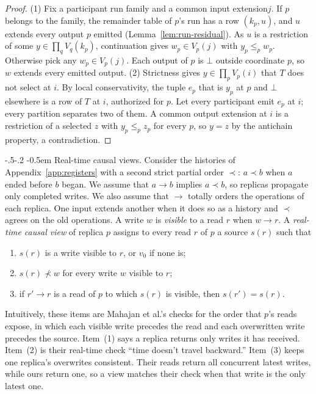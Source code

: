 \documentclass[sigconf]{cidr-2027}
\makeatletter
\theoremstyle{remark}
\renewcommand\paragraph{\@startsection{paragraph}{4}{\z@}%
  {-.5\baselineskip \@plus -2\p@ \@minus -.2\p@}%
  {-0.5em}%
  {\normalfont\bfseries}}
\newcommand{\inrel}{extends\xspace}          %
\newcommand{\indesc}{input extension\xspace} %
\newcommand{\outrel}{extends\xspace}          %
\newcommand{\outnoun}{output extension\xspace}%
\makeatother
\begin{document}
\begin{proof}
(1) Fix a participant run family and a common \indesc $j$. If $p$ belongs to
the family, the remainder table of $p$'s run has a row $(k_p,u)$, and $u$ \outrel every output $p$ emitted
(Lemma~\ref{lem:run-residual}). As $u$ is a restriction of some
$y\in\prod_qV_q(k_p)$, continuation gives $w_p\in V_p(j)$ with $y_p\le_p w_p$. Otherwise pick any $w_p\in V_p(j)$. Each output of $p$ is $\bot$ outside
coordinate $p$, so $w$ \outrel every emitted output. (2) Strictness gives $y\in\prod_pV_p(i)$ that $T$ does not select at $i$. By
local conservativity, the tuple $e_p$ that is $y_p$ at $p$ and $\bot$
elsewhere is a row of $T$ at $i$, authorized for $p$. Let every participant
emit $e_p$ at $i$; every partition separates two of them. A common \outnoun
at $i$ is a restriction of a selected $z$ with $y_p\le_p z_p$ for every $p$, so
$y=z$ by the antichain property, a contradiction.
\end{proof}

\paragraph{Real-time causal views.}
Consider the histories of Appendix~\ref{app:registers} with a second strict
partial order $\prec$: $a\prec b$ when $a$ ended before $b$ began. We assume
that $a\to b$ implies $a\prec b$, so replicas propagate only completed writes. We also assume that $\to$ totally orders the operations of each replica. One
input \inrel another when it does so as a history and $\prec$ agrees on the
old operations. A write $w$ is \emph{visible} to a read $r$ when $w\to r$. A
\emph{real-time causal view} of replica $p$ assigns to every read $r$ of $p$ a
source $s(r)$ such that
\begin{enumerate}
\item
$s(r)$ is a write visible to $r$, or $v_0$ if none is;
\item
$s(r)\not\prec w$ for every write $w$ visible to $r$;
\item
if $r'\to r$ is a read of $p$ to which $s(r)$ is visible, then
        $s(r')=s(r)$.
\end{enumerate}
Intuitively, these items are Mahajan et al.'s checks for the order that $p$'s
reads expose, in which each visible write precedes the read and each
overwritten write precedes the source. Item~(1) says a replica returns only
writes it has received. Item~(2) is their real-time check ``time doesn't
travel backward.''  Item~(3) keeps one replica's overwrites consistent. Their
reads return all concurrent latest writes, while ours return one, so a view
matches their check when that write is the only latest one.
\end{document}
